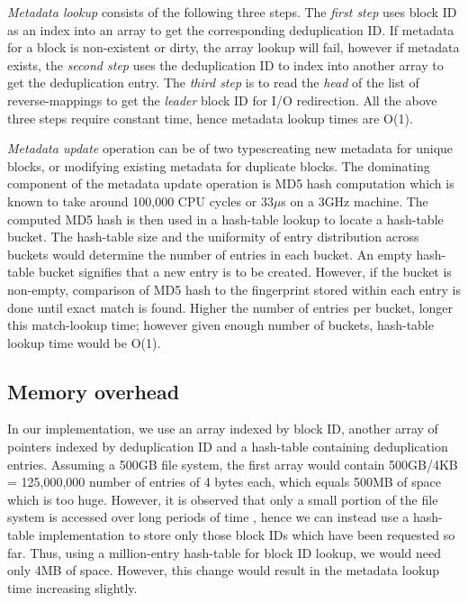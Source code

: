 \textit{Metadata lookup} consists of the following three steps.
The \textit{first step} uses block ID as an index into an
array to get the corresponding deduplication ID. If metadata for a block
is non-existent or dirty, the array lookup will fail, however if
metadata exists, the \textit{second step} uses the deduplication
ID to index into another array to get the deduplication entry.
The \textit{third step} is to read the \textit{head} of the list of 
reverse-mappings to get the \textit{leader} block ID for I/O redirection. 
All the above three steps require constant time, hence metadata lookup
times are O(1).

\textit{Metadata update} operation can be of two 
types\textemdash{}creating new metadata for unique blocks, or
modifying existing metadata for duplicate blocks.
The dominating component of the metadata update operation is MD5
hash computation which is known to take around 100,000 CPU
cycles\cite{iodedup} or 33$\mu$s on a 3GHz machine. The computed MD5 hash 
is then used in a hash-table
lookup to locate a hash-table bucket. The hash-table size and
the uniformity of entry distribution across buckets would determine the
number of entries in each bucket. An empty hash-table bucket signifies that
a new entry is to be created. However, if the bucket is non-empty,
comparison of MD5 hash to the fingerprint stored within each entry is done
until exact match is found. Higher the number of entries per bucket, longer
this match-lookup time; however given enough number of buckets,
hash-table lookup time would be O(1).


\subsection{Memory overhead}
In our implementation, we use an array indexed by block ID, another
array of pointers indexed by deduplication ID and a hash-table containing
deduplication entries. Assuming a 500GB file system,
the first array
would contain 500GB/4KB = 125,000,000 number of entries of 4 bytes each,
which equals 500MB of space which is too huge.
However, it is observed that only a small
portion of the file system is accessed over long periods of time \cite{iodedup},
hence we can instead use a hash-table implementation to store only those
block IDs which have been requested so far. Thus, using a million-entry
hash-table for block ID lookup, we would need only
4MB of space. However, this change would result in the metadata lookup time
increasing slightly.

